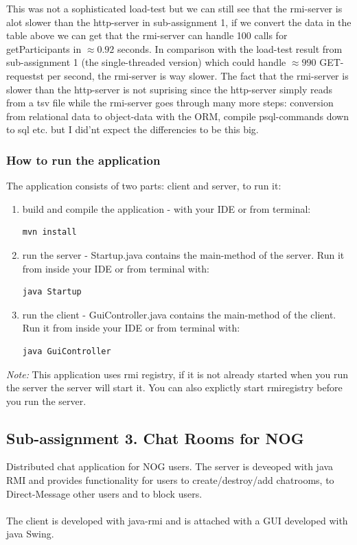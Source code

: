 \documentclass[a4paper, 11pt]{article}
\begin{document}
This was not a sophisticated load-test but we can still see that the rmi-server is alot slower than the http-server in sub-assignment 1, if we convert the data in the table above we can get that the rmi-server can handle 100 calls for getParticipants in $\approx 0.92$ seconds. In comparison with the load-test result from sub-assignment 1 (the single-threaded version) which could handle $\approx 990$ GET-requestst per second, the rmi-server is way slower. The fact that the rmi-server is slower than the http-server is not suprising since the http-server simply reads from a tsv file while the rmi-server goes through many more steps: conversion from relational data to object-data with the ORM, compile psql-commands down to sql etc. but I did'nt expect the differencies to be this big.
\subsubsection{How to run the application}
The application consists of two parts: client and server, to run it:
\begin{enumerate}
\item build and compile the application - with your IDE or from terminal:
\begin{verbatim}
mvn install
\end{verbatim}
\item run the server - Startup.java contains the main-method of the server. Run it from inside your IDE or from terminal with: 
\begin{verbatim}
java Startup
\end{verbatim}
\item run the client - GuiController.java contains the main-method of the client. Run it from inside your IDE or from terminal with: 
\begin{verbatim}
java GuiController
\end{verbatim}
\end{enumerate}
\textit{Note:} This application uses rmi registry, if it is not already started when you run the server the server will start it. You can also explictly start rmiregistry before you run the server.
\subsection{Sub-assignment 3. Chat Rooms for NOG}
Distributed chat application for NOG users.
The server is deveoped with java RMI and provides functionality for users to create/destroy/add chatrooms, to Direct-Message other users and to block users.
\\ \\The client is developed with java-rmi and is attached with a GUI developed with java Swing.
\end{document}
